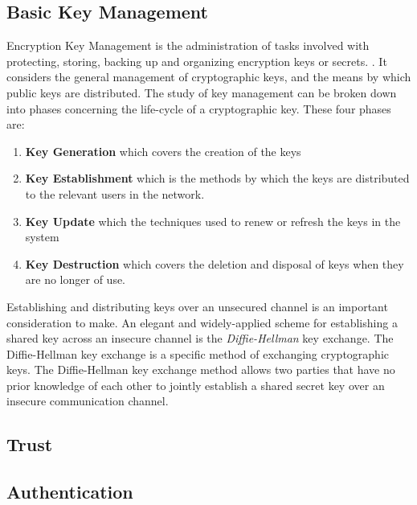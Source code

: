 			\subsection{Basic Key Management}
			Encryption Key Management is the administration of tasks involved with protecting, storing, backing up and organizing encryption keys or secrets. \cite{defination:key-management}. It considers the general management of cryptographic keys, and the means by which public keys are distributed. The study of key management can be broken down into phases concerning the life-cycle of a cryptographic key. These four phases are: \\
			
			\begin{enumerate}
				\item \textbf{Key Generation} which covers the creation of the keys
				
				\item \textbf{Key Establishment} which is the methods by which the keys are distributed to the relevant users in the network.
				
				\item \textbf{Key Update} which the techniques used to renew or refresh the keys in the system
				
				\item \textbf{Key Destruction} which covers the deletion and disposal of keys when they are no longer of use.
			\end{enumerate}

			Establishing and distributing keys over an unsecured channel is an important consideration to make. An elegant and widely-applied scheme for establishing a shared key across an insecure channel is the \emph{Diffie-Hellman} key exchange. The Diffie-Hellman key exchange is a specific method of exchanging cryptographic keys. The Diffie-Hellman key exchange method allows two parties that have no prior knowledge of each other to jointly establish a shared secret key over an insecure communication channel. \\

	\subsection{Trust}

	\subsection{Authentication}

